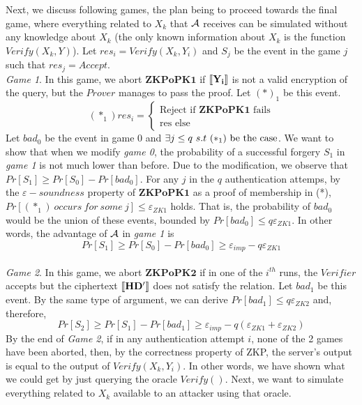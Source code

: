 Next, we discuss following games, the plan being to proceed towards the final
game, where everything related to $X_k$ that $\mathcal{A}$ receives can be simulated
without any knowledge about $X_k$ (the only known information about $X_k$ is the
function $Verify(X_k, Y)$). Let $res_i = Verify(X_k, Y_{i})$ and $S_j$ be
the event in the game $j$ such that $res_j = Accept$.\\
\textit{Game 1}. In this game, we abort $\mathbf{ZKPoPK1}$ if $\left\llbracket\mathbf{Y_{i}}\right\rrbracket$ is
not a valid encryption of the query, but the $Prover$ manages to pass the
proof. Let $(*)_1$ be this event.
\[
  (*_1)res_i = \begin{cases}
    \text{Reject if } \mathbf{ZKPoPK1} \text{ fails}\\
    \text{res else}
  \end{cases}
\]
Let $bad_0$ be the event in game 0 and
$\exists j \leq q\ s.t\ (*_1)\ \textnormal{be the case}$. We want to show that
when we modify \textit{game 0}, the probability of a successful forgery $S_1$ in
\textit{game 1} is not much lower than before. Due to the modification, we
observe that $ Pr[S_1] \geq Pr[S_0] - Pr[bad_0] $. For any $j$ in the $q$
authentication attemps, by the $\varepsilon-soundness$ property of
$\mathbf{ZKPoPK1}$ as a proof of membership in (*),
$Pr[(*_1)\ occurs\ for\ some \ j] \leq \varepsilon_{ZK1}$ holds. That is, the
probability of $bad_0$ would be the union of these events, bounded by
$Pr[bad_0] \leq q\varepsilon_{ZK1}$. In other words, the advantage of
$\mathcal{A}$ in \textit{game 1} is
\[
  Pr[S_1] \geq Pr[S_0] - Pr[bad_0] \geq \varepsilon_{imp} - q\varepsilon_{ZK1}
\]
\\
\textit{Game 2}. In this game, we abort $\mathbf{ZKPoPK2}$ if in one of the
$i^{th}$ runs, the $Verifier$ accepts but the ciphertext $\left\llbracket\mathbf{HD'}\right\rrbracket$
does not satisfy the relation. Let $bad_1$ be this event. By the same type of
argument, we can derive $Pr[bad_1] \leq q\varepsilon_{ZK2}$ and, therefore,
$$Pr[S_2] \geq Pr[S_1]
- Pr[bad_1] \geq \varepsilon_{imp} - q(\varepsilon_{ZK1}+\varepsilon_{ZK2})
$$
By the end of \textit{Game 2}, if in any authentication attempt $i$, none of the
2 games have been aborted, then, by the correctness property of ZKP, the
server's output is equal to the output of $Verify(X_k, Y_{i})$. In other words,
we have shown what we could get by just querying the oracle $Verify()$. Next, we
want to simulate everything related to $X_k$ available to an attacker using that oracle.\\

